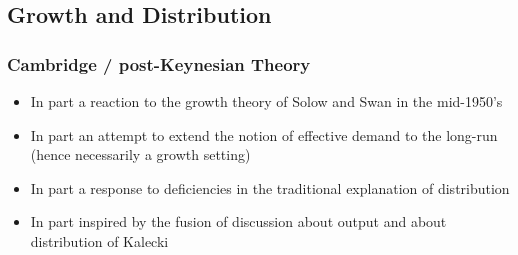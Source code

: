 \documentclass[a4paper,twoside]{article}
\numberwithin{equation}{section}
\numberwithin{figure}{section}
\begin{document}
\subsection{Growth and Distribution}
\subsubsection{Cambridge / post-Keynesian Theory}
	\begin{itemize}
		\item In part a reaction to the growth theory of Solow and Swan in the mid-1950's
		\item In part an attempt to extend the notion of effective demand to the long-run (hence necessarily a growth setting)
		\item In part a response to deficiencies in the traditional explanation of distribution
		\item In part inspired by the fusion of discussion about output and about distribution of Kalecki
	\end{itemize}
\end{document}
